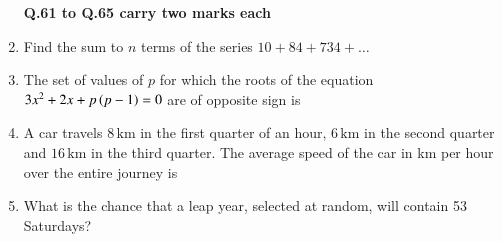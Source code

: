 \documentclass[journal,12pt,onecolumn]{IEEEtran}
\theoremstyle{remark}
\begin{document}
\begin{enumerate}
\textbf{Q.61 to Q.65 carry two marks each}

\item Find the sum to $n$ terms of the series $10 + 84 + 734 + \ldots$
\par \hfill{}
\begin{enumerate}
\end{enumerate}


\item The set of values of $p$ for which the roots of the equation $3x^2 + 2x + p\left(p - 1\right) = 0$ are of opposite sign is  
\par \hfill{}
\begin{enumerate}
\end{enumerate}

\item A car travels $8\,\text{km}$ in the first quarter of an hour, $6\,\text{km}$ in the second quarter and $16\,\text{km}$ in the third quarter. The average speed of the car in km per hour over the entire journey is  
\par \hfill{}
\begin{enumerate}
\end{enumerate}

\item What is the chance that a leap year, selected at random, will contain 53 Saturdays?  
\par \hfill{}
\begin{enumerate}
\end{enumerate}


\end{enumerate}
\end{document}
